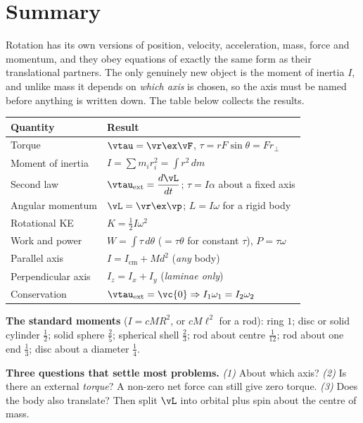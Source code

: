 \section{Summary}\label{sec:summary14}
Rotation has its own versions of position, velocity, acceleration, mass, force and momentum, and they obey
equations of exactly the same form as their translational partners. The only genuinely new object is the
moment of inertia $I$, and unlike mass it depends on \emph{which axis} is chosen, so the axis must be named
before anything is written down. The table below collects the results.

\medskip
{\small\renewcommand{\arraystretch}{1.45}
\begin{center}
\begin{tabular}{@{}ll@{}}
\toprule
Quantity & Result\\
\midrule
Torque             & $\vtau=\vr\ex\vF$, \quad $\tau=rF\sin\theta=F r_\perp$\\[2pt]
Moment of inertia  & $I=\sum m_ir_i^{2}=\int r^{2}\,dm$\\[2pt]
Second law         & $\vtau_{\text{ext}}=\dfrac{d\vL}{dt}$; \quad $\tau=I\alpha$ about a fixed axis\\[4pt]
Angular momentum   & $\vL=\vr\ex\vp$; \quad $L=I\omega$ for a rigid body\\[2pt]
Rotational KE      & $K=\tfrac{1}{2}I\omega^{2}$\\[2pt]
Work and power     & $W=\int\tau\,d\theta$ ($=\tau\theta$ for constant $\tau$), \quad $P=\tau\omega$\\[2pt]
Parallel axis      & $I=I_{\text{cm}}+Md^{2}$ \quad (\emph{any} body)\\[2pt]
Perpendicular axis & $I_z=I_x+I_y$ \quad (\emph{laminae only})\\[2pt]
Conservation       & $\vtau_{\text{ext}}=\vc{0}\Rightarrow I_1\omega_1=I_2\omega_2$\\
\bottomrule
\end{tabular}
\end{center}
}

\medskip
\textbf{The standard moments} ($I=cMR^{2}$, or $cM\ell^{2}$ for a rod): ring $1$; disc or solid
cylinder $\tfrac{1}{2}$; solid sphere $\tfrac{2}{5}$; spherical shell $\tfrac{2}{3}$; rod about centre
$\tfrac{1}{12}$; rod about one end $\tfrac{1}{3}$; disc about a diameter $\tfrac{1}{4}$.

\medskip
\textbf{Three questions that settle most problems.} \emph{(1)} About which axis?
\emph{(2)} Is there an external \emph{torque}? A non-zero net force can still give zero torque.
\emph{(3)} Does the body also translate? Then split $\vL$ into orbital plus spin about the centre of
mass.

